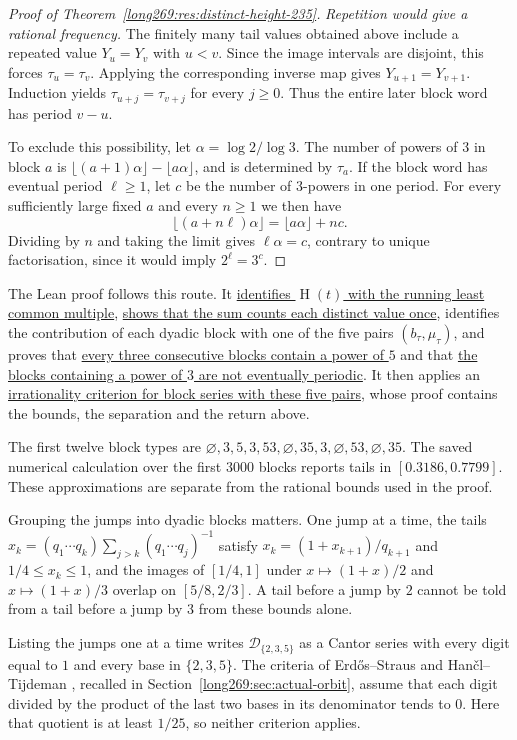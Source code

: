 \documentclass[11pt]{article}
\theoremstyle{remark}
\theoremstyle{plain}
\newcommand{\distinctheightlean}{https://github.com/wcook04/plectis-erdos/blob/5154f4c46fa5d5ab2cff8df857a0b10f310cbeeb/lean/ErdosProblems/Erdos269/DistinctHeightIrrationality.lean}
\newcommand{\distinctheightblocklean}{https://github.com/wcook04/plectis-erdos/blob/5154f4c46fa5d5ab2cff8df857a0b10f310cbeeb/lean/ErdosProblems/Erdos269/DistinctHeightBlockRadix.lean}
\newcommand{\hgt}{\operatorname{H}}
\begin{document}
\begin{proof}[Proof of Theorem~\ref{long269:res:distinct-height-235}]
\medskip
\emph{Repetition would give a rational frequency.}
The finitely many tail values obtained above include a repeated value
$Y_u=Y_v$ with $u<v$. Since the image intervals are disjoint, this
forces $\tau_u=\tau_v$. Applying the corresponding inverse map gives
$Y_{u+1}=Y_{v+1}$. Induction yields
$\tau_{u+j}=\tau_{v+j}$ for every $j\ge0$. Thus the entire later block
word has period $v-u$.

To exclude this possibility, let $\alpha=\log2/\log3$. The number of powers
of $3$ in block $a$ is
$\lfloor(a+1)\alpha\rfloor-\lfloor a\alpha\rfloor$, and is determined by
$\tau_a$. If the block word has eventual period $\ell\ge1$, let $c$ be the
number of $3$-powers in one period. For every sufficiently large fixed $a$
and every $n\ge1$ we then have
\[
 \lfloor(a+n\ell)\alpha\rfloor=\lfloor a\alpha\rfloor+nc.
\]
Dividing by $n$ and taking the limit gives $\ell\alpha=c$, contrary to
unique factorisation, since it would imply $2^\ell=3^c$.
\end{proof}
The Lean proof follows this route.  It
\href{\distinctheightlean\#L60}{identifies $\hgt(t)$ with the running least
common multiple}, \href{\distinctheightlean\#L698}{shows that the sum counts
each distinct value once}, identifies the contribution of each dyadic block
with one of the five pairs $(b_\tau,\mu_\tau)$, and proves that
\href{\distinctheightlean\#L437}{every three consecutive blocks contain a power
of $5$} and that \href{\distinctheightlean\#L494}{the blocks containing a power
of $3$ are not eventually periodic}.  It then applies an
\href{\distinctheightblocklean\#L340}{irrationality criterion for block series
with these five pairs}, whose proof contains the bounds, the separation and
the return above.

The first twelve block types are
$\varnothing,3,5,3,53,\varnothing,35,3,\varnothing,53,\varnothing,35$.
The saved numerical calculation over the first $3000$ blocks reports tails
in $[0.3186,0.7799]$. These approximations are separate from the rational
bounds used in the proof.

Grouping the jumps into dyadic blocks matters.  One jump at a time, the
tails $x_k=(q_1\cdots q_k)\sum_{j>k}(q_1\cdots q_j)^{-1}$
satisfy $x_{k}=(1+x_{k+1})/q_{k+1}$ and $1/4\le x_k\le1$, and the images of
$[1/4,1]$ under $x\mapsto(1+x)/2$ and $x\mapsto(1+x)/3$ overlap on
$[5/8,2/3]$.  A tail before a jump by $2$ cannot be told from a tail before a
jump by $3$ from these bounds alone.

Listing the jumps one at a time writes $\mathcal D_{\{2,3,5\}}$ as a
Cantor series with every digit equal to $1$ and every base in $\{2,3,5\}$.  The criteria of
Erd\H{o}s--Straus \cite[Theorem~2.1]{erdosstraus1974} and
Han\v{c}l--Tijdeman \cite[Theorem~3.1]{hancltijdeman2004}, recalled in
Section~\ref{long269:sec:actual-orbit}, assume that each digit divided by
the product of the last two bases in its denominator tends to $0$.  Here that
quotient is at least $1/25$, so neither criterion applies.
\end{document}
